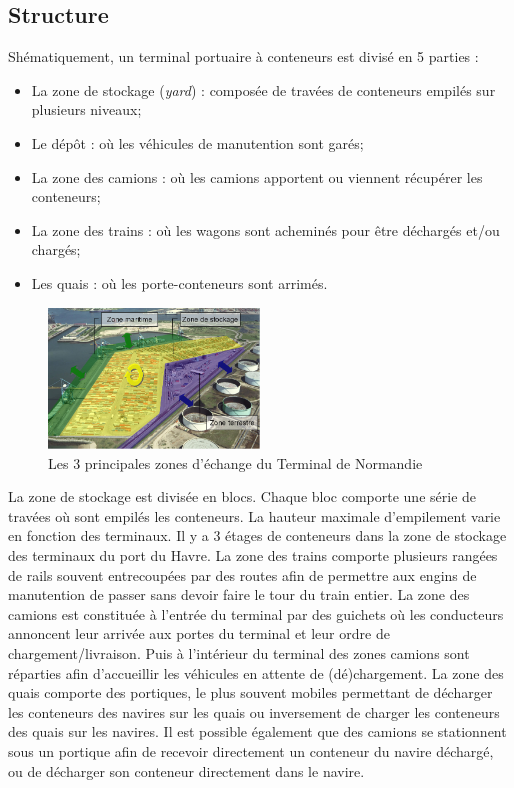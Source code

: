 
\subsection{Structure}
Shématiquement, un terminal portuaire à conteneurs est divisé en 5 parties : 
\begin{itemize}
 \item La zone de stockage (\textit{yard}) : composée de travées de conteneurs empilés sur plusieurs niveaux;
 \item Le dépôt : où les véhicules de manutention sont garés;
 \item La zone des camions : où les camions apportent ou viennent récupérer les conteneurs;
 \item La zone des trains : où les wagons sont acheminés pour être déchargés et/ou chargés;
 \item Les quais : où les porte-conteneurs sont arrimés. 
\end{itemize}

\begin{figure}[ht]
 \label{fig:zonesTN}
 \begin{center}
 \includegraphics[width=0.5\textwidth]{chapitres/application/3zonesDuTN.png}
 \caption{Les 3 principales zones d'échange du Terminal de Normandie}
 \end{center}
\end{figure}

La zone de stockage est divisée en blocs. Chaque bloc comporte une série de travées où sont empilés les conteneurs. La hauteur maximale d'empilement varie en fonction des terminaux. Il y a 3 étages de conteneurs dans la zone de stockage des terminaux du port du Havre.
La zone des trains comporte plusieurs rangées de rails souvent entrecoupées par des routes afin de permettre aux engins de manutention de passer sans devoir faire le tour du train entier.
La zone des camions est constituée à l'entrée du terminal par des guichets où les conducteurs annoncent leur arrivée aux portes du terminal et leur ordre de chargement/livraison. Puis à l'intérieur du terminal des zones camions sont réparties afin d'accueillir les véhicules en attente de (dé)chargement.
La zone des quais comporte des portiques, le plus souvent mobiles permettant de décharger les conteneurs des navires sur les quais ou inversement de charger les conteneurs des quais sur les navires. Il est possible également que des camions se stationnent sous un portique afin de recevoir directement un conteneur du navire déchargé, ou de décharger son conteneur directement dans le navire.

